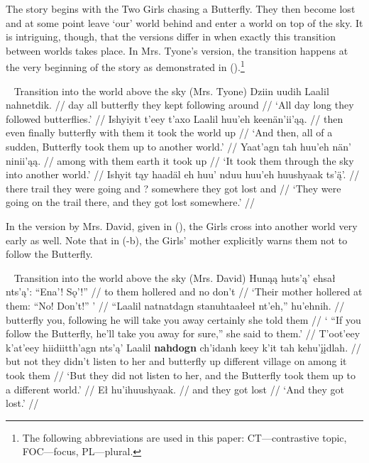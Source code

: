 The story begins with the Two Girls chasing a Butterfly. They then become lost and at some point leave `our' world behind and enter a world on top of the sky. It is intriguing, though, that the versions differ in when exactly this transition between worlds takes place. In Mrs. Tyone's version, the transition happens at the very beginning of the story as demonstrated in ().\footnote{The following abbreviations are used in this paper: CT—contrastive topic, FOC—focus, PL—plural.}

\pex~ Transition into the world above the sky (Mrs. Tyone) 
\a
\begingl
\gla Dziin uudih Laalil nahnetdik.  //
\glb day all butterfly {they kept following around} //
\glft `All day long they followed butterflies.' //
\endgl
\a
\begingl
\gla Ishyiyit t'eey t'axo Laalil huu'eh keenän'ii'ąą.  //
\glb then even finally butterfly {with them} {it took the world up} //
\glft `And then, all of a sudden, Butterfly took them up to another world.' //
\endgl
\a
\begingl
\gla Yaat'agn tah huu'eh nän' ninii'ąą.  //
 among with them earth {it took up} //
\glft `It took them through the sky into another world.'  //
\endgl
\a
\begingl
\gla Ishyit tąy haadäl eh huu' nduu {huu'eh huushyaak} ts'ą̈'.  //
\glb there trail {they were going} and ? somewhere {they got lost} and //
\glft `They were going on the trail there, and they got lost somewhere.' //
\endgl
\xe

In the version by Mrs. David, given in (), the Girls cross into another world very early as well. Note that in (-{b}), the Girls' mother explicitly warns them not to follow the Butterfly.

\pex~ Transition into the world above the sky (Mrs. David) 
\a
\begingl
\gla Hunąą huts'ą' ehsał nts'ą': ``Ena'! Sǫ'!''  //
 {to them} hollered and no don't //
\glft `Their mother hollered at them: ``No! Don't!'' ' //
\endgl
\a
\begingl
\gla ``Laalil natnatdagn stanuhtaałeeł nt'eh,'' hu'ehnih.  //
\glb butterfly {you, following} {he will take you away} certainly {she told them} //
\glft ` ``If you follow the Butterfly, he'll take you away for sure,'' she said to them.' //
\endgl
\a
\begingl
\gla T'oot'eey k'at'eey hiidiitth'agn nts'ą' Laalil \textbf{nahdogn} ch'idanh keey k'it tah kehu'įįdlah.  //
\glb but not {they didn't listen to her} and butterfly up different village on among {it took them} //
\glft `But they did not listen to her, and the Butterfly took them up to a different world.' //
\endgl
\a
\begingl
\gla Eł hu'ihuushyaak.  //
\glb and {they got lost} //
\glft `And they got lost.' //
\endgl
\xe

